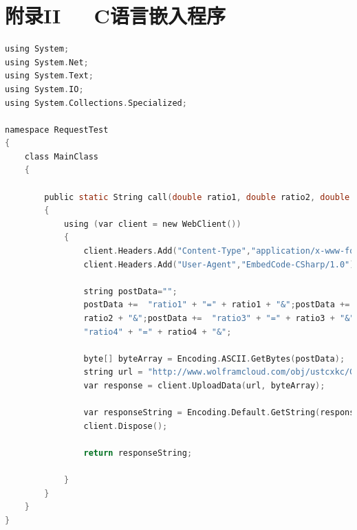 \documentclass{ctexart}
\newcommand{\0}{\boldsymbol{0}}
\begin{document}
    \section*{\kaishu\LARGE\bfseries{附录II~~~C语言嵌入程序}}
\begin{lstlisting}[language=C]
using System;
using System.Net;
using System.Text;
using System.IO;
using System.Collections.Specialized;

namespace RequestTest
{
	class MainClass
	{

		public static String call(double ratio1, double ratio2, double ratio3, double ratio4)
		{
			using (var client = new WebClient())
			{
    			client.Headers.Add("Content-Type","application/x-www-form-urlencoded");
				client.Headers.Add("User-Agent","EmbedCode-CSharp/1.0");
				
				string postData="";	
				postData +=  "ratio1" + "=" + ratio1 + "&";postData +=  "ratio2" + "=" + 
                ratio2 + "&";postData +=  "ratio3" + "=" + ratio3 + "&";postData +=  
                "ratio4" + "=" + ratio4 + "&";
				
				byte[] byteArray = Encoding.ASCII.GetBytes(postData);
				string url = "http://www.wolframcloud.com/obj/ustcxkc/GoodBadPredictor";
				var response = client.UploadData(url, byteArray);

   				var responseString = Encoding.Default.GetString(response);
				client.Dispose();
				
        		return responseString;

			}
		}
	}
}
\end{lstlisting}
\end{document}
